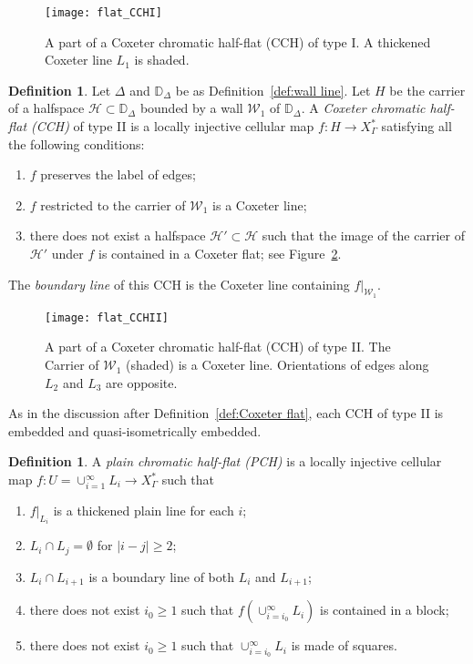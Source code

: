 \documentclass[11pt]{amsart}
\newcommand {\D}{\mathbb D}
\newcommand {\h}{\mathcal H}
\newcommand {\W}{\mathcal W}
\theoremstyle{definition}
\newtheorem{definition}[theorem]{Definition}
\newcommand{\Xa}{X^{\ast}}
\begin{document}
\begin{figure}[h!]
	\centering
	\texttt{[image: flat\_CCHI]}
	\caption{A part of a Coxeter chromatic half-flat (CCH) of type I. A thickened Coxeter line $L_1$ is shaded.}
	\label{f:flat_CCHI}
\end{figure}

\begin{definition}
	\label{def:CCHII}
Let $\Delta$ and $\D_{\Delta}$ be as Definition~\ref{def:wall line}. Let $H$ be the carrier of a halfspace $\h\subset\D_\Delta$ bounded by a wall $\W_1$ of $\D_\Delta$. A \emph{Coxeter chromatic half-flat (CCH)} of type II is a locally injective cellular map $f\colon  H\to \Xa_\Gamma$ satisfying all the following conditions:
	\begin{enumerate}
	\item $f$ preserves the label of edges;
	\item $f$ restricted to the carrier of $\W_1$ is a Coxeter line;
    \item there does not exist a halfspace $\h'\subset \h$ such that the image of the carrier of $\h'$ under $f$ is contained in a Coxeter flat; see Figure~\ref{f:flat_CCHII}.
	\end{enumerate}
The \emph{boundary line} of this CCH is the Coxeter line containing $f|_{\W_1}$. 
\end{definition}

\begin{figure}[h!]
	\centering
	\texttt{[image: flat\_CCHII]}
	\caption{A part of a Coxeter chromatic half-flat (CCH) of type II. The Carrier of $\mathcal W_1$ (shaded) is a Coxeter line. Orientations of edges along $L_2$ and $L_3$ are opposite.}
	\label{f:flat_CCHII}
\end{figure}


As in the discussion after Definition~\ref{def:Coxeter flat}, each CCH of type II is embedded and quasi-isometrically embedded.

\begin{definition}
	\label{def:PCH}
	A \emph{plain chromatic half-flat (PCH)} is a locally injective cellular map $f\colon  U=\cup_{i=1}^{\infty} L_i\to \Xa_\Gamma$ such that
	\begin{enumerate}
		\item $f|_{L_i}$ is a thickened plain line for each $i$;
		\item $L_i\cap L_j=\emptyset$ for $|i-j|\ge 2$;
		\item $L_i\cap L_{i+1}$ is a boundary line of both $L_i$ and $L_{i+1}$;
		\item there does not exist $i_0\ge 1$ such that $f(\cup_{i=i_0}^{\infty} L_i)$ is contained in a block;
		\item there does not exist $i_0\ge 1$ such that $\cup_{i=i_0}^{\infty} L_i$ is made of squares.
	\end{enumerate}
\end{definition}
\end{document}
